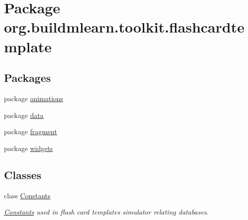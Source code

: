 \hypertarget{namespaceorg_1_1buildmlearn_1_1toolkit_1_1flashcardtemplate}{}\section{Package org.\+buildmlearn.\+toolkit.\+flashcardtemplate}
\label{namespaceorg_1_1buildmlearn_1_1toolkit_1_1flashcardtemplate}
\subsection*{Packages}
\begin{DoxyCompactItemize}
\item 
package \hyperlink{namespaceorg_1_1buildmlearn_1_1toolkit_1_1flashcardtemplate_1_1animations}{animations}
\item 
package \hyperlink{namespaceorg_1_1buildmlearn_1_1toolkit_1_1flashcardtemplate_1_1data}{data}
\item 
package \hyperlink{namespaceorg_1_1buildmlearn_1_1toolkit_1_1flashcardtemplate_1_1fragment}{fragment}
\item 
package \hyperlink{namespaceorg_1_1buildmlearn_1_1toolkit_1_1flashcardtemplate_1_1widgets}{widgets}
\end{DoxyCompactItemize}
\subsection*{Classes}
\begin{DoxyCompactItemize}
\item 
class \hyperlink{classorg_1_1buildmlearn_1_1toolkit_1_1flashcardtemplate_1_1Constants}{Constants}
\begin{DoxyCompactList}\small\item\em \hyperlink{classorg_1_1buildmlearn_1_1toolkit_1_1flashcardtemplate_1_1Constants}{Constants} used in flash card template\textquotesingle{}s simulator relating databases. \end{DoxyCompactList}\end{DoxyCompactItemize}
